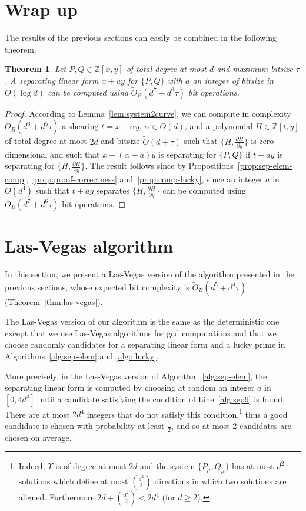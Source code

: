 \documentclass{sig-alternate}
\newtheorem{theorem}{Theorem}
\newcommand {\Z}   {\mathbb Z}
\newcommand{\OO}{\ensuremath{{{O}}}}
\newcommand{\sO}{\ensuremath{\widetilde{{O}}}}
\newcommand{\sOB}{\ensuremath{\widetilde{{O}}_B}}
\newcommand{\blue}[1]{\color{blue}#1\color{black}\xspace}
\renewcommand{\blue}[1]{#1\xspace}
\begin{document}
\section{Wrap up}
The results of the previous sections can easily be combined in the following theorem.

\begin{theorem}\label{thm:final}
Let $P,Q \in \Z[x,y]$ of total degree at most $d$ and maximum bitsize $\tau$. A separating linear form $x+ay$ for $\{P,Q\}$ with $a$ an integer of bitsize in \blue{$\OO(\log d)$}  can be computed using $\sOB(d^7+d^6\tau)$ bit operations.
\end{theorem}


\begin{proof}
According to Lemma~\ref{lem:system2curve}, we can compute in complexity $\sOB(d^6+d^5\tau)$ a
\blue{shearing} $t=x+\alpha y$, $\alpha\in O(d)$, and a polynomial $H \in \Z[t,y]$ of total degree at most
$2d$ and bitsize  $\sO(d+\tau)$ such that $\{H,\frac{\partial H}{\partial y}\}$ is
zero-dimensional and such that $x+(\alpha+a)y$ is separating for
$\{P,Q\}$ if $t+ay$ is separating for $\{H,\frac{\partial H}{\partial y}\}$. The result follows since by
Propositions~\ref{prop:sep-elem-comp},~\ref{prop:proof-correctness}
and~\ref{prop:comp-lucky}, since an
 integer $a$ in $\OO(d^4)$ such that $t+ay$ separates $\{H,\frac{\partial H}{\partial y}\}$ can be computed using  $\sOB(d^7+d^6\tau)$ bit operations.
\end{proof}


\section{\blue{Las-Vegas algorithm}} \label{sec:Las-Vegas}



\blue{In this section, we present a Las-Vegas version of the algorithm presented in the
previous sections, whose expected bit complexity is $\sOB(d^5+d^4\tau)$ 
(Theorem~\ref{thm:las-vegas}).}



The Las-Vegas version of our algorithm is the same as the deterministic one except that we use
Las-Vegas algorithms for gcd computations and that we choose randomly candidates for a separating linear
form and a lucky prime
 in Algorithms~\ref{alg:sep-elem} and \ref{algo:lucky}.


 More precisely, \blue{in the Las-Vegas version of}
 Algorithm~\ref{alg:sep-elem}, the separating linear form is computed by
 choosing at random an integer $a$ in $[0,4d^4]$ until a candidate satisfying the
 condition of Line~\ref{alg:sep9} is found. There are at most $2d^4$ integers
 that do not satisfy this condition,\footnote{\small Indeed, $\Upsilon$ is of
   degree at most $2d$ and the system $\{P_\mu,Q_\mu\}$ has at most $d^2$
   solutions which define at most $d^2\choose 2$ directions in which two
   solutions are aligned. Furthermore $2d+{d^2\choose 2}< 2d^4$ (for $d\geq
   2$).}  thus a good candidate is chosen with probability at least $\frac12$,
 and so at most 2 candidates are chosen on average.
\end{document}
